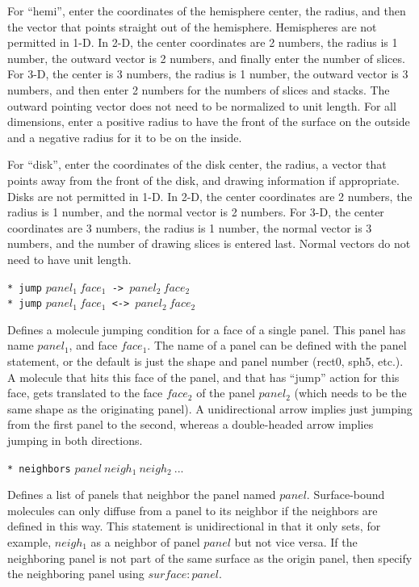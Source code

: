 \documentclass {book}
\newcommand {\ttt} {\texttt}
\begin{document}
\begin{description}
For ``hemi'', enter the coordinates of the hemisphere center, the radius, and then the vector that points straight out of the hemisphere. Hemispheres are not permitted in 1-D. In 2-D, the center coordinates are 2 numbers, the radius is 1 number, the outward vector is 2 numbers, and finally enter the number of slices. For 3-D, the center is 3 numbers, the radius is 1 number, the outward vector is 3 numbers, and then enter 2 numbers for the numbers of slices and stacks. The outward pointing vector does not need to be normalized to unit length. For all dimensions, enter a positive radius to have the front of the surface on the outside and a negative radius for it to be on the inside.

For ``disk'', enter the coordinates of the disk center, the radius, a vector that points away from the front of the disk, and drawing information if appropriate. Disks are not permitted in 1-D. In 2-D, the center coordinates are 2 numbers, the radius is 1 number, and the normal vector is 2 numbers. For 3-D, the center coordinates are 3 numbers, the radius is 1 number, the normal vector is 3 numbers, and the number of drawing slices is entered last. Normal vectors do not need to have unit length.

\item{\ttt{* jump} $panel_1\ face_1$\ttt{ -> }$panel_2\ face_2$\\
\ttt{* jump} $panel_1\ face_1$\ttt{ <-> }$panel_2\ face_2$}

Defines a molecule jumping condition for a face of a single panel. This panel has name $panel_1$, and face $face_1$. The name of a panel can be defined with the panel statement, or the default is just the shape and panel number (rect0, sph5, etc.). A molecule that hits this face of the panel, and that has ``jump'' action for this face, gets translated to the face $face_2$ of the panel $panel_2$ (which needs to be the same shape as the originating panel). A unidirectional arrow implies just jumping from the first panel to the second, whereas a double-headed arrow implies jumping in both directions.

\item{\ttt{* neighbors} $panel\ neigh_1\ neigh_2\ ...$}

Defines a list of panels that neighbor the panel named $panel$. Surface-bound molecules can only diffuse from a panel to its neighbor if the neighbors are defined in this way. This statement is unidirectional in that it only sets, for example, $neigh_1$ as a neighbor of panel $panel$ but not vice versa. If the neighboring panel is not part of the same surface as the origin panel, then specify the neighboring panel using $surface:panel$.


\end{description}
\end{document}
